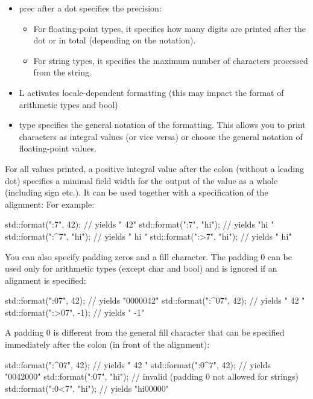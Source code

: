 \begin{itemize}
\item 
prec after a dot specifies the precision:

\begin{itemize}
\item 
For floating-point types, it specifies how many digits are printed after the dot or in total (depending on the notation).

\item 
For string types, it specifies the maximum number of characters processed from the string.
\end{itemize}

\item 
L activates locale-dependent formatting (this may impact the format of arithmetic types and bool)

\item 
type specifies the general notation of the formatting. This allows you to print characters as integral values (or vice versa) or choose the general notation of floating-point values.
\end{itemize}


For all values printed, a positive integral value after the colon (without a leading dot) specifies a minimal field width for the output of the value as a whole (including sign etc.). It can be used together with a specification of the alignment: For example:

\begin{cpp}
std::format("{:7}", 42);     // yields "           42"
std::format("{:7}", "hi");   // yields "hi           "
std::format("{:^7}", "hi");  // yields "      hi     "
std::format("{:>7}", "hi");  // yields "           hi"
\end{cpp}

You can also specify padding zeros and a fill character. The padding 0 can be used only for arithmetic types (except char and bool) and is ignored if an alignment is specified:

\begin{cpp}
std::format("{:07}", 42);    // yields "0000042"
std::format("{:^07}", 42);   // yields "  42   "
std::format("{:>07}", -1);   // yields "     -1"
\end{cpp}

A padding 0 is different from the general fill character that can be specified immediately after the colon (in front of the alignment):

\begin{cpp}
std::format("{:^07}", 42);   // yields "  42   "
std::format("{:0^7}", 42);   // yields "0042000"
std::format("{:07}", "hi");  // invalid (padding 0 not allowed for strings)
std::format("{:0<7}", "hi"); // yields "hi00000"
\end{cpp}

